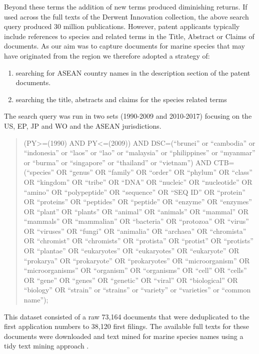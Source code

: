 \documentclass[openany]{book}
\providecommand{\tightlist}{%
  \setlength{\itemsep}{0pt}\setlength{\parskip}{0pt}}
\theoremstyle{definition}
\theoremstyle{definition}
\theoremstyle{definition}
\theoremstyle{remark}
\begin{document}
Beyond these terms the addition of new terms produced diminishing
returns. If used across the full texts of the Derwent Innovation
collection, the above search query produced 30 million publications.
However, patent applicants typically include references to species and
related terms in the Title, Abstract or Claims of documents. As our aim
was to capture documents for marine species that may have originated
from the region we therefore adopted a strategy of:

\begin{enumerate}
\def\labelenumi{\alph{enumi})}
\tightlist
\item
  searching for ASEAN country names in the description section of the
  patent documents.
\item
  searching the title, abstracts and claims for the species related
  terms
\end{enumerate}

The search query was run in two sets (1990-2009 and 2010-2017) focusing
on the US, EP, JP and WO and the ASEAN jurisdictions.

\begin{quote}
(PY\textgreater{}=(1990) AND PY\textless{}=(2009)) AND DSC=(``brunei''
or ``cambodia'' or ``indonesia'' or ``laos'' or ``lao'' or ``malaysia''
or ``philippines'' or ``myanmar'' or ``burma'' or ``singapore'' or
``thailand'' or ``vietnam'') AND CTB=(``species'' OR ``genus'' OR
``family'' OR ``order'' OR ``phylum'' OR ``class'' OR ``kingdom'' OR
``tribe'' OR ``DNA'' OR ``nucleic'' OR ``nucleotide'' OR ``amino'' OR
``polypeptide'' OR ``sequence'' OR ``SEQ ID'' OR ``protein'' OR
``proteins'' OR ``peptides'' OR ``peptide'' OR ``enzyme'' OR ``enzymes''
OR ``plant'' OR ``plants'' OR ``animal'' OR ``animals'' OR ``mammal'' OR
``mammals'' OR ``mammalian'' OR ``bacteria'' OR ``protozoa'' OR
``virus'' OR ``viruses'' OR ``fungi'' OR ``animalia'' OR ``archaea'' OR
``chromista'' OR ``chromist'' OR ``chromists'' OR ``protista'' OR
``protist'' OR ``protists'' OR ``plantae'' OR ``eukaryotes'' OR
``eukaryotes'' OR ``eukaryote'' OR ``prokarya'' OR ``prokaryote'' OR
``prokaryotes'' OR ``microorganism'' OR ``microorganisms'' OR
``organism'' OR ``organisms'' OR ``cell'' OR ``cells'' OR ``gene'' OR
``genes'' OR ``genetic'' OR ``viral'' OR ``biological'' OR ``biology''
OR ``strain'' or ``strains'' or ``variety'' or ``varieties'' or ``common
name'');
\end{quote}

This dataset consisted of a raw 73,164 documents that were deduplicated
to the first application numbers to 38,120 first filings. The available
full texts for these documents were downloaded and text mined for marine
species names using a tidy text mining approach \citep{R-tidytext}.
\end{document}
